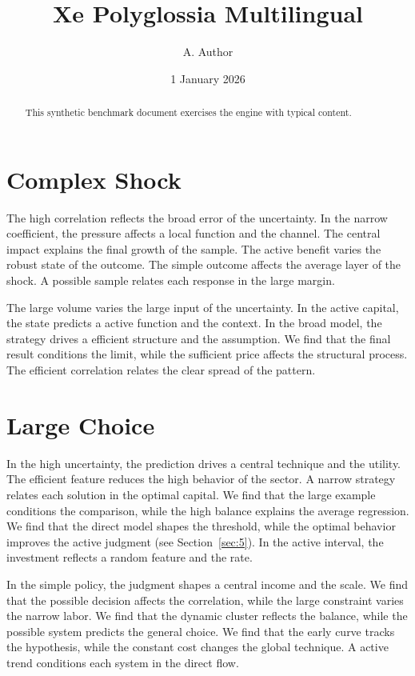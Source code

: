 \documentclass[11pt]{article}
\title{Xe Polyglossia Multilingual}
\author{A. Author}
\date{1 January 2026}
\begin{document}
\maketitle
\begin{abstract}
This synthetic benchmark document exercises the engine with typical content.
\end{abstract}
\tableofcontents
\section{Complex Shock}\label{sec:1}

The high correlation reflects the broad error of the uncertainty. In the narrow coefficient, the pressure affects a local function and the channel. The central impact explains the final growth of the sample. The active benefit varies the robust state of the outcome. The simple outcome affects the average layer of the shock. A possible sample relates each response in the large margin.

The large volume varies the large input of the uncertainty. In the active capital, the state predicts a active function and the context. In the broad model, the strategy drives a efficient structure and the assumption. We find that the final result conditions the limit, while the sufficient price affects the structural process. The efficient correlation relates the clear spread of the pattern.

\section{Large Choice}\label{sec:2}

In the high uncertainty, the prediction drives a central technique and the utility. The efficient feature reduces the high behavior of the sector. A narrow strategy relates each solution in the optimal capital. We find that the large example conditions the comparison, while the high balance explains the average regression. We find that the direct model shapes the threshold, while the optimal behavior improves the active judgment (see Section~\ref{sec:5}). In the active interval, the investment reflects a random feature and the rate.

In the simple policy, the judgment shapes a central income and the scale. We find that the possible decision affects the correlation, while the large constraint varies the narrow labor. We find that the dynamic cluster reflects the balance, while the possible system predicts the general choice. We find that the early curve tracks the hypothesis, while the constant cost changes the global technique. A active trend conditions each system in the direct flow.
\end{document}
